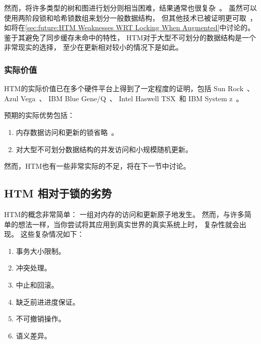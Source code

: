 然而，将许多类型的树和图进行划分则相当困难，结果通常也很复杂~\cite{Ellis80}。
虽然可以使用两阶段锁和哈希锁数组来划分一般数据结构，
但其他技术已被证明更可取~\cite{DavidSMiller2006HashedLocking}，
如将在\cref{sec:future:HTM Weaknesses WRT Locking When Augmented}中讨论的。
鉴于其避免了同步缓存未命中的特性，
HTM对于大型不可划分的数据结构是一个非常现实的选择，
至少在更新相对较小的情况下是如此。

\QuickQuizEnd

\subsubsection{实际价值}
\label{sec:future:Practical Value}

HTM的实际价值已在多个硬件平台上得到了一定程度的证明，包括
Sun Rock~\cite{DaveDice2009ASPLOSRockHTM}、
Azul Vega~\cite{CliffClick2009AzulHTM}、
IBM Blue Gene/Q~\cite{RickMerrit2011PowerTM}、
Intel Haswell TSX~\cite{RaviRajwar2012TSX}和
IBM System z~\cite{ChristianJacobi2012MainframeTM}。

预期的实际优势包括：

\begin{enumerate}
\item	内存数据访问和更新的锁省略~\cite{Martinez01a,Rajwar02a}。
\item	对大型不可划分数据结构的并发访问和小规模随机更新。
\end{enumerate}

然而，HTM也有一些非常实际的不足，将在下一节中讨论。

\subsection{HTM 相对于锁的劣势}
\label{sec:future:HTM Weaknesses WRT Locking}

HTM的概念非常简单：
一组对内存的访问和更新原子地发生。
然而，与许多简单的想法一样，当你尝试将其应用到真实世界的真实系统上时，
复杂性就会出现。
这些复杂情况如下：

\begin{enumerate}
\item	事务大小限制。
\item	冲突处理。
\item	中止和回滚。
\item	缺乏前进进度保证。
\item	不可撤销操作。
\item	语义差异。
\end{enumerate}

